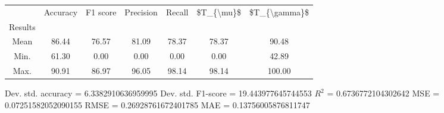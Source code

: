 \begin{tabular}{|c|c|c|c|c|c|c|}
\toprule
{} &  Accuracy &  F1 score &  Precision &  Recall &  \$T\_\{\textbackslash mu\}\$ &  \$T\_\{\textbackslash gamma\}\$ \\
Results &           &           &            &         &            &               \\
\hline
Mean    &     86.44 &     76.57 &      81.09 &   78.37 &      78.37 &         90.48 \\
Min.    &     61.30 &      0.00 &       0.00 &    0.00 &       0.00 &         42.89 \\
Max.    &     90.91 &     86.97 &      96.05 &   98.14 &      98.14 &        100.00 \\
\bottomrule
\end{tabular}

 Dev. std. accuracy = 6.3382910636959995
 Dev. std. F1-score = 19.443977645744553
 $R^2$ = 0.6736772104302642
 MSE = 0.07251582052090155
 RMSE = 0.26928761672401785
 MAE = 0.13756005876811747